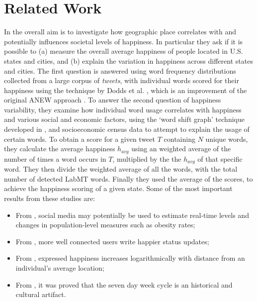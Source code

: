 \documentclass{llncs}
\begin{document}
\section{Related Work}
\label{sec:rw}

In \cite{Mitchell2013,Dodds2011,Frank2013,Bliss2012} the overall aim is to investigate how geographic place correlates with and potentially influences societal levels of happiness. In particular they ask if it is possible to (a) measure the overall average happiness of people located in U.S. states and cities, and (b) explain the variation in happiness across different states and cities. The first question is answered using word frequency distributions collected from a large corpus of \emph{tweets}, with individual words scored for their happiness using the technique by Dodds et al. \cite{Dodds2009}, which is an improvement of the original ANEW approach \cite{Bradley1999}. To answer the second question of happiness variability, they examine how individual word usage correlates with happiness and various social and economic factors, using the `word shift graph' technique developed in \cite{Dodds2011,Dodds2009}, and socioeconomic census data to attempt to explain the usage of certain words. To obtain a score for a given tweet $T$ containing $N$ unique words, they calculate the average happiness $h_{avg}$ using an weighted average of the number of times a word occurs in $T$, multiplied by the the $h_{avg}$ of that specific word. They then divide the weighted average of all the words, with the total number of detected LabMT words. Finally they used the average of the scores, to achieve the happiness scoring of a given state. Some of the most important results from these studies are:
\begin{itemize}
\item From \cite{Mitchell2013}, social media may potentially be used to estimate real-time levels and changes in population-level measures such as obesity rates;
\item From \cite{Bliss2012}, more well connected users write happier status updates;
\item From \cite{Frank2013}, expressed happiness increases logarithmically with distance from an individual's average location;
\item From \cite{Dodds2011}, it was proved that the seven day week cycle is an historical and cultural artifact.
\end{itemize}
\end{document}
